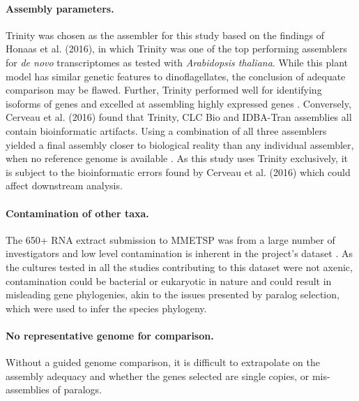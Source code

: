 \documentclass[12pt]{article}
\begin{document}
\paragraph*{Assembly parameters.}
Trinity was chosen as the assembler for this study based on the findings of Honaas et al. (2016), in which Trinity was one of the top performing assemblers for \textit{de novo} transcriptomes as tested with \textit{Arabidopsis thaliana}. 
While this plant model has similar genetic features to dinoflagellates, the conclusion of adequate comparison may be flawed.
Further, Trinity performed well for identifying isoforms of genes and excelled at assembling highly expressed genes \cite{honaas2016selecting}.
Conversely, Cerveau et al. (2016) found that Trinity, CLC Bio and IDBA-Tran assemblies all contain bioinformatic artifacts. 
Using a combination of all three assemblers yielded a final assembly closer to biological reality than any individual assembler, when no reference genome is available \cite{cerveau2016combining}.
As this study uses Trinity exclusively, it is subject to the bioinformatic errors found by Cerveau et al. (2016) which could affect downstream analysis.
\paragraph*{Contamination of other taxa.} 
The 650+ RNA extract submission to MMETSP was from a large number of investigators and low level contamination is inherent in the project's dataset \cite{keeling2014marine}. 
As the cultures tested in all the studies contributing to this dataset were not axenic, contamination could be bacterial or eukaryotic in nature and could result in misleading gene phylogenies, akin to the issues presented by paralog selection, which were used to infer the species phylogeny.
\paragraph*{No representative genome for comparison.} 
Without a guided genome comparison, it is difficult to extrapolate on the assembly adequacy and whether the genes selected are single copies, or mis-assemblies of paralogs.
\end{document}
